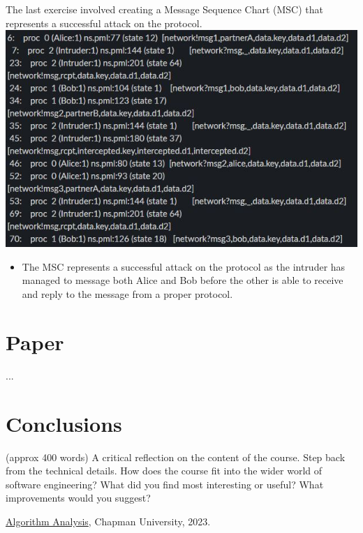 \documentclass{article}
\theoremstyle{theorem}
\theoremstyle{definition}
\theoremstyle{remark}
\begin{document}
\\
\\ The last exercise involved creating a Message Sequence Chart (MSC) that represents a successful attack on the protocol.
\\ \includegraphics{Report Images/HW9_1.jpg}
\begin{itemize}
    \item The MSC represents a successful attack on the protocol as the intruder has managed to message both Alice and Bob before the other is able to receive and reply to the message from a proper protocol.
\end{itemize}
\section{Paper}

...

\section{Conclusions}\label{conclusions}

(approx 400 words) A critical reflection on the content of the course. Step back from the technical details. How does the course fit into the wider world of software engineering? What did you find most interesting or useful? What improvements would you suggest?

\begin{thebibliography}{99}
 \href{https://github.com/alexhkurz/algorithm-analysis-2023}{Algorithm Analysis}, Chapman University, 2023.
\end{thebibliography}
\end{document}
